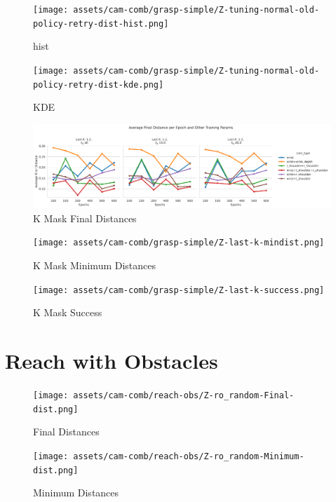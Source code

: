   \begin{figure}[H]
    \centering
    \texttt{[image: assets/cam-comb/grasp-simple/Z-tuning-normal-old-policy-retry-dist-hist.png]}
    \caption{hist}
  \end{figure}

  \begin{figure}[H]
    \centering
    \texttt{[image: assets/cam-comb/grasp-simple/Z-tuning-normal-old-policy-retry-dist-kde.png]}
    \caption{KDE}
  \end{figure}

  \begin{figure}[htpb]
    \centering
    \includegraphics[scale=0.6]{assets/cam-comb/grasp-simple/Z-last-k-dist.png}
    \caption{K Mask Final Distances}
  \end{figure}

  \begin{figure}[htpb]
    \centering
    \texttt{[image: assets/cam-comb/grasp-simple/Z-last-k-mindist.png]}
    \caption{K Mask Minimum Distances}
  \end{figure}

  \begin{figure}[htpb]
    \centering
    \texttt{[image: assets/cam-comb/grasp-simple/Z-last-k-success.png]}
    \caption{K Mask Success}
  \end{figure}

\section{Reach with Obstacles}
  \begin{figure}[H]
    \centering
    \texttt{[image: assets/cam-comb/reach-obs/Z-ro\_random-Final-dist.png]}
    \caption{Final Distances}
  \end{figure}

  \begin{figure}[H]
    \centering
    \texttt{[image: assets/cam-comb/reach-obs/Z-ro\_random-Minimum-dist.png]}
    \caption{Minimum Distances}
  \end{figure}

